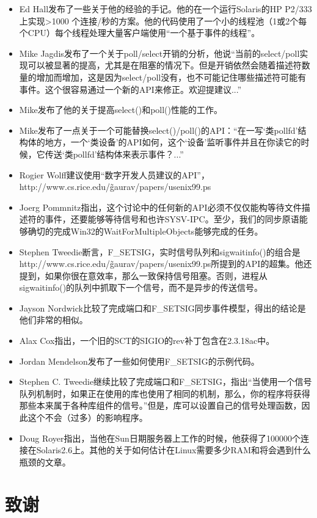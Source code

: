\documentclass[twoside, xetex]{report}
\begin{document}
	\begin{itemize}
		\item Ed Hall发布了一些关于他的经验的手记。他的在一个运行Solaris的HP P2/333上实现>1000 个连接/秒的方案。他的代码使用了一个小的线程池（1或2个每个CPU）每个线程处理大量客户端使用“一个基于事件的线程”。
		\item Mike Jagdis发布了一个关于poll/select开销的分析，他说“当前的select/poll实现可以被显著的提高，尤其是在阻塞的情况下。但是开销依然会随着描述符数量的增加而增加，这是因为select/poll没有，也不可能记住哪些描述符可能有事件。这个很容易通过一个新的API来修正。欢迎提建议...”
		\item Mike发布了他的关于提高select()和poll()性能的工作。
		\item Mike发布了一点关于一个可能替换select()/poll()的API：“在一写‘类pollfd’结构体的地方，一个‘类设备’的API如何，这个‘设备’监听事件并且在你读它的时候，它传送‘类pollfd’结构体来表示事件？...”
		\item Rogier Wolff建议使用“数字开发人员建议的API”，http://www.cs.rice.edu/\~gaurav/papers/usenix99.ps
		\item Joerg Pommnitz指出，这个讨论中的任何新的API必须不仅仅能构等待文件描述符的事件，还要能够等待信号和也许SYSV-IPC。至少，我们的同步原语能够确切的完成Win32的WaitForMultipleObjects能够完成的任务。
		\item Stephen Tweedie断言，F\_SETSIG，实时信号队列和sigwaitinfo()的组合是http://www.cs.rice.edu/\~gaurav/papers/usenix99.ps所提到的API的超集。他还提到，如果你很在意效率，那么一致保持信号阻塞。否则，进程从sigwaitinfo()的队列中抓取下一个信号，而不是异步的传送信号。
		\item Jayson Nordwick比较了完成端口和F\_SETSIG同步事件模型，得出的结论是他们非常的相似。
		\item Alax Cox指出，一个旧的SCT的SIGIO的rev补丁包含在2.3.18ac中。
		\item Jordan Mendelson发布了一些如何使用F\_SETSIG的示例代码。
		\item Stephen C. Tweedie继续比较了完成端口和F\_SETSIG，指出“当使用一个信号队列机制时，如果正在使用的库也使用了相同的机制，那么，你的程序将获得那些本来属于各种库组件的信号。”但是，库可以设置自己的信号处理函数，因此这个不会（过多）的影响程序。
		\item Doug Royer指出，当他在Sun日期服务器上工作的时候，他获得了100000个连接在Solaris2.6上。其他的关于如何估计在Linux需要多少RAM和将会遇到什么瓶颈的文章。
	\end{itemize}
	
\chapter{致谢}
\end{document}
